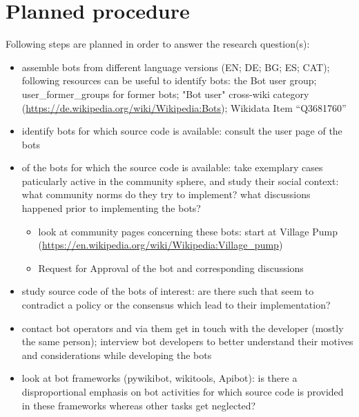 \documentclass[pdftex,a4paper,11pt]{scrartcl}
\begin{document}

\section{Planned procedure}

Following steps are planned in order to answer the research question(s):

\begin{itemize}
    \item assemble bots from different language versions (EN; DE; BG; ES; CAT); following resources can be useful to identify bots: the Bot user group; user\_former\_groups for former bots; "Bot user" cross-wiki category (\url{https://de.wikipedia.org/wiki/Wikipedia:Bots}); Wikidata Item “Q3681760”
    \item identify bots for which source code is available: consult the user page of the bots
    \item of the bots for which the source code is available: take exemplary cases paticularly active in the community sphere, and study their social context: what community norms do they try to implement? what discussions happened prior to implementing the bots?
    \begin{itemize}
        \item look at community pages concerning these bots: start at Village Pump (\url{https://en.wikipedia.org/wiki/Wikipedia:Village_pump})
        \item Request for Approval of the bot and corresponding discussions
    \end{itemize}
    \item study source code of the bots of interest: are there such that seem to contradict a policy or the consensus which lead to their implementation?
    \item contact bot operators and via them get in touch with the developer (mostly the same person); interview bot developers to better understand their motives and considerations while developing the bots
    \item look at bot frameworks (pywikibot, wikitools, Apibot): is there a disproportional emphasis on bot activities for which source code is provided in these frameworks whereas other tasks get neglected?

\end{itemize}
\end{document}
